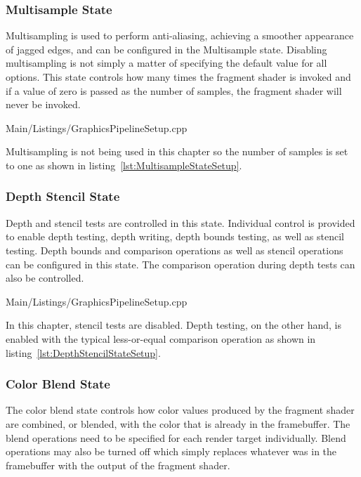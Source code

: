       \subsubsection{Multisample State}
      \label{sss:MultisampleState}
        Multisampling is used to perform anti-aliasing, achieving a smoother appearance of jagged edges, and can be configured in the Multisample state.
        Disabling multisampling is not simply a matter of specifying the default value for all options.
        This state controls how many times the fragment shader is invoked and if a value of zero is passed as the number of samples, the fragment shader will never be invoked.

        
        {Main/Listings/GraphicsPipelineSetup.cpp}

        Multisampling is not being used in this chapter so the number of samples is set to one as shown in listing~\ref{lst:MultisampleStateSetup}.

      \subsubsection{Depth Stencil State}
        Depth and stencil tests are controlled in this state.
        Individual control is provided to enable depth testing, depth writing, depth bounds testing, as well as stencil testing.
        Depth bounds and comparison operations as well as stencil operations can be configured in this state.
        The comparison operation during depth tests can also be controlled.

        
        {Main/Listings/GraphicsPipelineSetup.cpp}

        In this chapter, stencil tests are disabled.
        Depth testing, on the other hand, is enabled with the typical less-or-equal comparison operation as shown in listing~\ref{lst:DepthStencilStateSetup}.

      \subsubsection{Color Blend State}
        The color blend state controls how color values produced by the fragment shader are combined, or blended, with the color that is already in the framebuffer.
        The blend operations need to be specified for each render target individually.
        Blend operations may also be turned off which simply replaces whatever was in the framebuffer with the output of the fragment shader.

